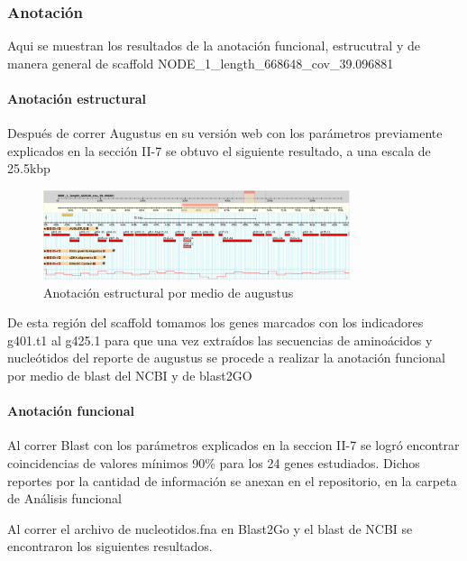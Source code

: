 \documentclass[journal, letterpaper, 11pt]{IEEEtran}
\begin{document}
\subsubsection{Anotación}
Aqui se muestran los resultados de la anotación funcional, estrucutral y de manera general de scaffold NODE\_1\_length\_668648\_cov\_39.096881

\paragraph{Anotación estructural}
Después de correr Augustus en su versión web con los parámetros previamente explicados en la sección II-7 se obtuvo el siguiente resultado, a una escala de 25.5kbp

\begin{figure}[H]
\centering
\includegraphics[width=9cm]{imagenes/agugustus.png}
\caption{Anotación estructural por medio de augustus}
\end{figure}

De esta región del scaffold tomamos los genes marcados con los indicadores g401.t1 al g425.1 para que una vez extraídos las secuencias de aminoácidos y nucleótidos del reporte de augustus se procede a realizar la anotación funcional por medio de blast del NCBI y de blast2GO

\paragraph{Anotación funcional}
Al correr Blast con los parámetros explicados en la seccion II-7 se logró encontrar coincidencias de valores mínimos 90\% para los 24 genes estudiados. Dichos reportes por la cantidad de información se anexan en el repositorio, en la carpeta de Análisis funcional 

Al correr el archivo de nucleotidos.fna en Blast2Go y el blast de NCBI se encontraron los siguientes resultados.
\end{document}
